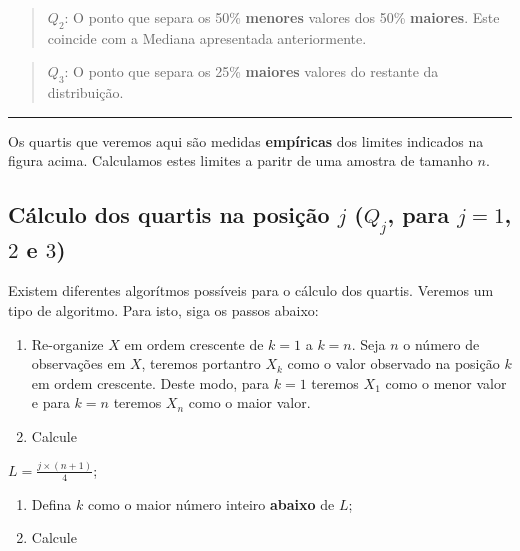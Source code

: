\documentclass[
]{book}
\begin{document}
\begin{quote}
\(Q_{2}\): O ponto que separa os 50\% \textbf{menores} valores dos 50\% \textbf{maiores}. Este coincide com a Mediana apresentada anteriormente.
\end{quote}

\begin{quote}
\(Q_{3}\): O ponto que separa os 25\% \textbf{maiores} valores do restante da distribuição.
\end{quote}

\begin{center}\rule{0.5\linewidth}{0.5pt}\end{center}

Os quartis que veremos aqui são medidas \textbf{empíricas} dos limites indicados na figura acima. Calculamos estes limites a paritr de uma amostra de tamanho \(n\).

\hypertarget{cuxe1lculo-dos-quartis-na-posiuxe7uxe3o-j-q_j-para-j-1-2-e-3}{%
\subsection{\texorpdfstring{Cálculo dos quartis na posição \(j\) (\(Q_j\), para \(j = 1\), \(2\) e \(3\))}{Cálculo dos quartis na posição j (Q\_j, para j = 1, 2 e 3)}}\label{cuxe1lculo-dos-quartis-na-posiuxe7uxe3o-j-q_j-para-j-1-2-e-3}}

Existem diferentes algorítmos possíveis para o cálculo dos quartis. Veremos um tipo de algoritmo. Para isto, siga os passos abaixo:

\begin{enumerate}
\def\labelenumi{\arabic{enumi}.}
\item
  Re-organize \(X\) em ordem crescente de \(k = 1\) a \(k = n\). Seja \(n\) o número de observações em \(X\), teremos portantro \(X_k\) como o valor observado na posição \(k\) em ordem crescente. Deste modo, para \(k = 1\) teremos \(X_1\) como o menor valor e para \(k = n\) teremos \(X_n\) como o maior valor.
\item
  Calcule
\end{enumerate}

\(L = \frac{j \times (n+1)}{4}\);

\begin{enumerate}
\def\labelenumi{\arabic{enumi}.}
\setcounter{enumi}{2}
\item
  Defina \(k\) como o maior número inteiro \textbf{abaixo} de \(L\);
\item
  Calcule
\end{enumerate}
\end{document}
